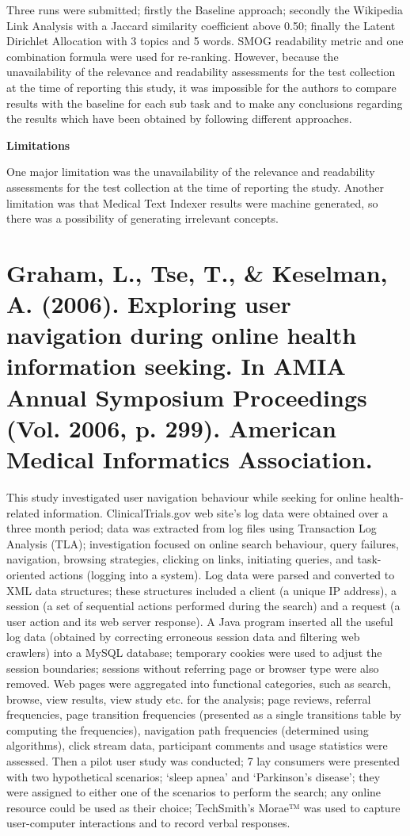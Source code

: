 \documentclass[]{article}
\begin{document}
Three runs were submitted; firstly the Baseline approach; secondly the Wikipedia Link Analysis with a Jaccard similarity coefficient above 0.50; finally the Latent Dirichlet Allocation with 3 topics and 5 words. SMOG readability metric and one combination formula were used for re-ranking. However, because the unavailability of the relevance and readability assessments for the test collection at the time of reporting this study, it was impossible for the authors to compare results with the baseline for each sub task and to make any conclusions regarding the results which have been obtained by following different approaches.            

\textbf{Limitations}

One major limitation was the unavailability of the relevance and readability assessments for the test collection at the time of reporting the study. Another limitation was that Medical Text Indexer results were machine generated, so there was a possibility of generating irrelevant concepts.     

\section{Graham, L., Tse, T., \& Keselman, A. (2006). Exploring user navigation during online health information seeking. In AMIA Annual Symposium Proceedings (Vol. 2006, p. 299). American Medical Informatics Association.}

This study investigated user navigation behaviour while seeking for online health-related information. ClinicalTrials.gov web site's log data were obtained over a three month period; data was extracted from log files using Transaction Log Analysis (TLA); investigation focused on online search behaviour, query failures, navigation, browsing strategies, clicking on links, initiating queries, and task-oriented actions (logging into a system). Log data were parsed and converted to XML data structures; these structures included a client (a unique IP address), a session (a set of sequential actions performed during the search) and a request (a user action and its web server response). A Java program inserted all the useful log data (obtained by correcting erroneous session data and filtering web crawlers) into a MySQL database; temporary cookies were used to adjust the session boundaries; sessions without referring page or browser type were also removed. Web pages were aggregated into functional categories, such as search, browse, view results, view study etc. for the analysis; page reviews, referral frequencies, page transition frequencies (presented as a single transitions table by computing the frequencies), navigation path frequencies (determined using algorithms), click stream data, participant comments and usage statistics were assessed. Then a pilot user study was conducted; 7 lay consumers were presented with two hypothetical scenarios; ‘sleep apnea’ and ‘Parkinson’s disease’; they were assigned to either one of the scenarios to perform the search; any online resource could be used as their choice; TechSmith’s Morae™ was used to capture user-computer interactions and to record verbal responses.
\end{document}
